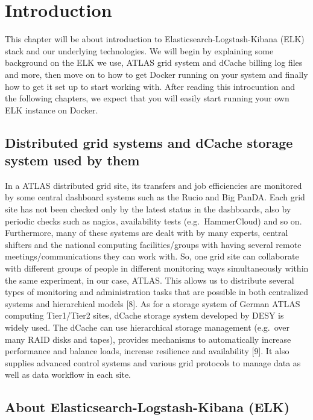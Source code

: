 \documentclass[]{article}
\author{}
\date{}
\begin{document}
\section{Introduction}\label{introduction}

This chapter will be about introduction to Elasticsearch-Logstash-Kibana
(ELK) stack and our underlying technologies. We will begin by explaining
some background on the ELK we use, ATLAS grid system and dCache billing
log files and more, then move on to how to get Docker running on your
system and finally how to get it set up to start working with. After
reading this introcuntion and the following chapters, we expect that you
will easily start running your own ELK instance on Docker.

\subsection{Distributed grid systems and dCache storage system used by
them}\label{distributed-grid-systems-and-dcache-storage-system-used-by-them}

In a ATLAS distributed grid site, its transfers and job efficiencies are
monitored by some central dashboard systems such as the Rucio and Big
PanDA. Each grid site has not been checked only by the latest status in
the dashboards, also by periodic checks such as nagios, availability
tests (e.g.~HammerCloud) and so on. Furthermore, many of these systems
are dealt with by many experts, central shifters and the national
computing facilities/groups with having several remote
meetings/communications they can work with. So, one grid site can
collaborate with different groups of people in different monitoring ways
simultaneously within the same experiment, in our case, ATLAS. This
allows us to distribute several types of monitoring and administration
tasks that are possible in both centralized systems and hierarchical
models {[}8{]}. As for a storage system of German ATLAS computing
Tier1/Tier2 sites, dCache storage system developed by DESY is widely
used. The dCache can use hierarchical storage management (e.g.~over many
RAID disks and tapes), provides mechanisms to automatically increase
performance and balance loads, increase resilience and availability
{[}9{]}. It also supplies advanced control systems and various grid
protocols to manage data as well as data workflow in each site.

\subsection{About Elasticsearch-Logstash-Kibana
(ELK)}\label{about-elasticsearch-logstash-kibana-elk}
\end{document}
